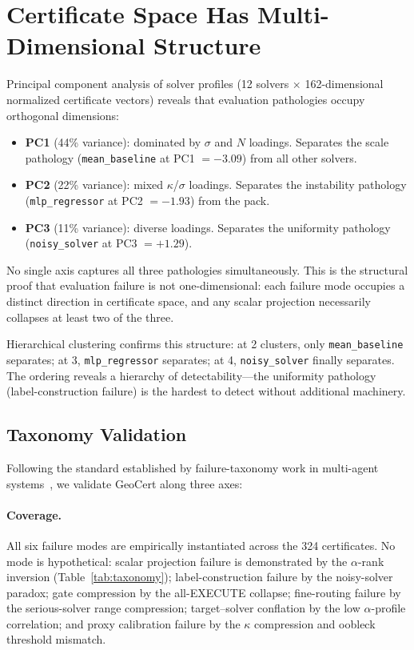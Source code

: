 \documentclass{article}
\begin{document}
\section{Certificate Space Has Multi-Dimensional Structure}

Principal component analysis of solver profiles (12 solvers $\times$ 162-dimensional normalized certificate vectors) reveals that evaluation pathologies occupy orthogonal dimensions:

\begin{itemize}
    \item \textbf{PC1} (44\% variance): dominated by $\sigma$ and $N$ loadings. Separates the scale pathology (\texttt{mean\_baseline} at PC1 $= -3.09$) from all other solvers.
    \item \textbf{PC2} (22\% variance): mixed $\kappa$/$\sigma$ loadings. Separates the instability pathology (\texttt{mlp\_regressor} at PC2 $= -1.93$) from the pack.
    \item \textbf{PC3} (11\% variance): diverse loadings. Separates the uniformity pathology (\texttt{noisy\_solver} at PC3 $= +1.29$).
\end{itemize}

No single axis captures all three pathologies simultaneously. This is the structural proof that evaluation failure is not one-dimensional: each failure mode occupies a distinct direction in certificate space, and any scalar projection necessarily collapses at least two of the three.

Hierarchical clustering confirms this structure: at 2 clusters, only \texttt{mean\_baseline} separates; at 3, \texttt{mlp\_regressor} separates; at 4, \texttt{noisy\_solver} finally separates. The ordering reveals a hierarchy of detectability---the uniformity pathology (label-construction failure) is the hardest to detect without additional machinery.

\subsection{Taxonomy Validation}

Following the standard established by failure-taxonomy work in multi-agent systems~\cite{mast2025}, we validate GeoCert along three axes:

\paragraph{Coverage.} All six failure modes are empirically instantiated across the 324 certificates. No mode is hypothetical: scalar projection failure is demonstrated by the $\alpha$-rank inversion (Table~\ref{tab:taxonomy}); label-construction failure by the noisy-solver paradox; gate compression by the all-EXECUTE collapse; fine-routing failure by the serious-solver range compression; target--solver conflation by the low $\alpha$-profile correlation; and proxy calibration failure by the $\kappa$ compression and oobleck threshold mismatch.
\end{document}

